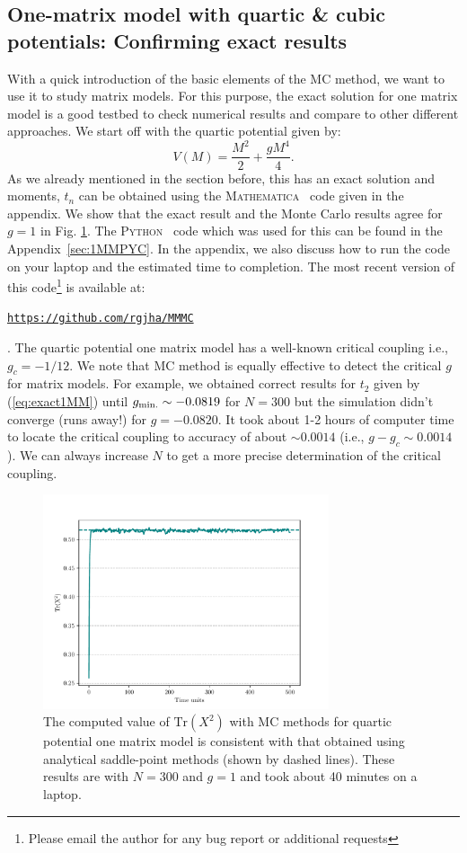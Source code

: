 \documentclass[11pt]{article}
\newcommand{\MA}{\textsc{Mathematica}}
\newcommand{\PY}{\textsc{Python}}
\begin{document}
\subsection{One-matrix model with quartic \& cubic potentials: Confirming exact results} 
With a quick introduction of the basic elements of the MC method, we want to use it to study matrix models. For this purpose, 
the exact solution for one matrix model is a good testbed to check numerical results and compare to other different approaches. 
We start off with the quartic potential given by:
\begin{equation}
	V(M) = \frac{M^2}{2} + \frac{gM^4}{4}.  
\end{equation}
As we already mentioned in the section before, this has an exact solution and moments, $t_{n}$ 
can be obtained using the \MA~ code given in the appendix. We show that the exact result and the 
Monte Carlo results agree for $g=1$ in Fig. \ref{fig:1MM_res}. The \PY~ code which was used for this 
can be found in the Appendix~\ref{sec:1MMPYC}. In the appendix, we also 
discuss how to run the code on your laptop and the estimated time to completion. The most recent version of this 
code\footnote{Please email the author for any bug report or additional requests} is available at:
\begin{center} \texttt{\href{https://github.com/rgjha/MMMC}{https://github.com/rgjha/MMMC}} \end{center}. 
The quartic potential one matrix model has a well-known critical coupling i.e., $ g_{c} = -1/12$. 
We note that MC method is equally effective to detect the critical $g$ for matrix models. 
For example, we obtained correct results for $t_{2}$ given by (\ref{eq:exact1MM}) 
until $g_{\rm{min.}} \sim -0.0819$ for $N=300$ but the simulation didn't converge (runs away!) 
for $g = -0.0820$. It took about 1-2 hours of computer time to 
locate the critical coupling to accuracy of about 
$\sim 0.0014$ (i.e., $g - g_{c} \sim 0.0014$). We can always increase $N$ to get a more precise determination of the critical coupling. 
\begin{figure}[htbp] 
	\centering 
	\includegraphics[width=0.75\textwidth]{figs/mm_plot.pdf}
	\caption{\label{fig:1MM_res}The computed value of $\mbox{Tr}(X^2)$ with MC methods for quartic potential
		one matrix model is consistent with that obtained using analytical saddle-point methods (shown by dashed lines). 
		These results are with $N = 300$ and $g = 1$ and took about 40 minutes on a laptop.}
\end{figure}
\end{document}
